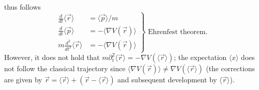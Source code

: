 thus follows
\begin{equation}
\left.\begin{array}{rl}{\frac{d}{d t}\langle\vec{r}\rangle} & {=\langle\vec{p}\rangle / m} \\ {\frac{d}{d t}\langle\vec{p}\rangle} & {=-\langle\nabla V(\vec{r})\rangle} \\ { m \frac{d^{2}}{d t^{2}}\langle\vec{r}\rangle} & {=-\langle\nabla V(\vec{r})\rangle}\end{array}\right\} \text { Ehrenfest theorem. }
\end{equation}
However, it does not hold that $m\partial_t^2\langle\vec{r}\rangle=-\nabla V(\langle\vec{r}\rangle)$; the expectation $\langle x\rangle$ does not follow the classical trajectory since $\langle\nabla V(\vec{r})\rangle\neq\nabla V(\langle\vec{r}\rangle)$ (the corrections are given by $\vec{r}=\langle\vec{r}\rangle + (\vec{r}-\langle\vec{r}\rangle)$ and subsequent development by $\langle \vec{r}\rangle$).
